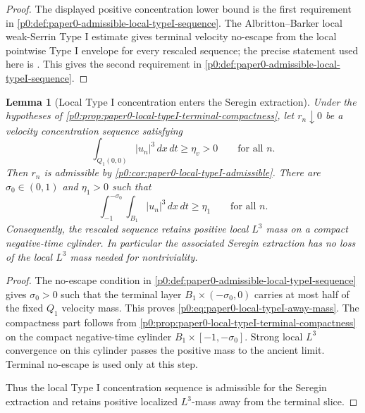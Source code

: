 \documentclass[11pt]{amsart}
\theoremstyle{plain}
\newtheorem{lemma}[lemma]{Lemma}
\theoremstyle{definition}
\theoremstyle{remark}
\numberwithin{equation}{section}
\begin{document}
\begin{proof}
The displayed positive concentration lower bound is the first requirement in
\cref{p0:def:paper0-admissible-local-typeI-sequence}.  The
Albritton--Barker local weak-Serrin Type I estimate
\cite{AlbrittonBarker2019} gives terminal velocity no-escape from the local
pointwise Type I envelope for every rescaled sequence; the precise statement used here is
.  This gives the second requirement in
\cref{p0:def:paper0-admissible-local-typeI-sequence}.
\end{proof}

\begin{lemma}[Local Type I concentration enters the Seregin extraction]
\label{p0:lem:paper0-local-typeI-into-terminal-dichotomy}
Under the hypotheses of
\cref{p0:prop:paper0-local-typeI-terminal-compactness}, let \(r_n\downarrow0\) be
a velocity concentration sequence satisfying
\[
  \int_{Q_1(0,0)} |u_n|^3\,dx\,dt\ge\eta_v>0
  \qquad\text{for all }n .
\]
Then \(r_n\) is admissible by
\cref{p0:cor:paper0-local-typeI-admissible}.  There are
\(\sigma_0\in(0,1)\) and \(\eta_1>0\) such that
\begin{equation}\label{p0:eq:paper0-local-typeI-away-mass}
  \int_{-1}^{-\sigma_0}\int_{B_1}|u_n|^3\,dx\,dt\ge\eta_1
  \qquad\text{for all }n.
\end{equation}
Consequently, the rescaled sequence retains positive local \(L^3\) mass on a
compact negative-time cylinder.  In particular the associated Seregin
extraction has no loss of the local \(L^3\) mass needed for
nontriviality.
\end{lemma}

\begin{proof}
The no-escape condition in
\cref{p0:def:paper0-admissible-local-typeI-sequence} gives \(\sigma_0>0\) such
that the terminal layer \(B_1\times(-\sigma_0,0)\) carries at most half of the
fixed \(Q_1\) velocity mass.  This proves
\eqref{p0:eq:paper0-local-typeI-away-mass}.  The compactness part follows
from \cref{p0:prop:paper0-local-typeI-terminal-compactness} on the compact
negative-time cylinder \(B_1\times[-1,-\sigma_0]\).  Strong local \(L^3\)
convergence on this cylinder passes the positive mass to the ancient limit.
Terminal no-escape is used only at this step.

Thus the local Type I concentration sequence is admissible for the Seregin
extraction and retains positive localized \(L^3\)-mass away from the terminal
slice.
\end{proof}
\end{document}
